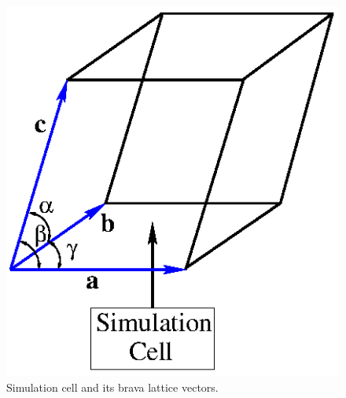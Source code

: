 \documentclass[prb,aps,nobibnotes,twocolumn,doublespace,twocolumngrid,superbib]{revtex4}
\begin{document}
\begin{figure}
\caption{Simulation cell and its brava lattice vectors.}
\label{figure:SimCell}
{\centering \includegraphics{UnitCell_2.ps} \par}
\end{figure}
%
%
%
\end{document}
